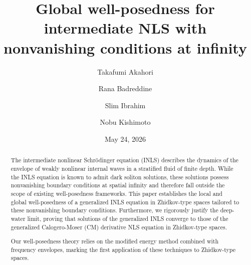 \documentclass{amsart}
\numberwithin{equation}{section}
\begin{document}

\title[GWP for intermediate NLS with nonvanishing conditions at infinity]{Global well-posedness for intermediate NLS with nonvanishing conditions at infinity}

\author{Takafumi Akahori}
\address{Faculty of Engineering, 
 Shizuoka University, Jyohoku 3-5-1, Hamamatsu-shi, Shizuoka, 432-8561, Japan.}

\author{Rana Badreddine}
\address{Department of Mathematics, University of California, Los Angeles, CA 90095, USA.}

\author{Slim Ibrahim}
\address{Department of Mathematics and Statistics, 
 University of Victoria, 3800 Finnerty Road, Victoria, BC V8P 5C2, Canada.}

\author{Nobu Kishimoto}
\address{Research Institute for Mathematical Sciences, 
 Kyoto University, Oiwake-Cho, Kitashirakawa, Sakyo-ku, Kyoto-shi, Kyoto, 606-8502, Japan.}


\begin{abstract}
The intermediate nonlinear Schr\"odinger equation (INLS) describes the dynamics of the envelope of weakly nonlinear internal waves in a stratified fluid of finite depth. While the INLS equation is known to admit dark soliton solutions, these solutions possess nonvanishing boundary conditions at spatial infinity and therefore fall outside the scope of existing well-posedness frameworks. This paper establishes the local and global well-posedness of a generalized INLS equation in Zhidkov-type spaces tailored to these nonvanishing boundary conditions. Furthermore, we rigorously justify the deep-water limit, proving that solutions of the generalized INLS converge to those of the generalized Calogero-Moser (CM) derivative NLS equation in Zhidkov-type spaces.

Our well-posedness theory relies on the modified energy method combined with frequency envelopes, marking the first application of these techniques to Zhidkov-type spaces.

\end{abstract}


\date{May 24, 2026}
\maketitle
\tableofcontents
\end{document}

